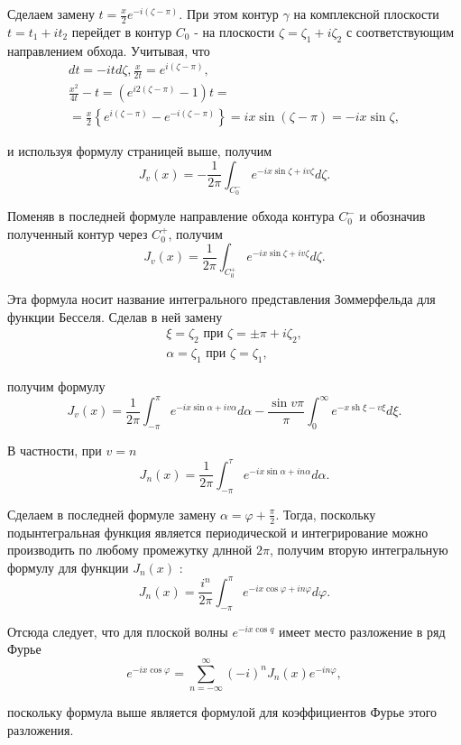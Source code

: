 Сделаем замену $t=\frac{x}{2} e^{-i(\zeta-\pi)}$. При этом контур $\gamma$ на комплексной плоскости $t=t_{1}+i t_{2}$ перейдет в контур $C_{0}$ - на плоскости $\zeta=\zeta_{1}+i \zeta_{2}$ с соответствующим направлением обхода. Учитывая, что
\[
\begin{aligned}
	d t=-i t d \zeta, \frac{x}{2 t}=e^{i(\zeta-\pi)}, \\
	\frac{x^{2}}{4 t}-t=\left(e^{i 2(\zeta-\pi)}-1\right) t= \\
	=\frac{x}{2}\left\{e^{i(\zeta-\pi)}-e^{-i(\zeta-\pi)}\right\}=i x \sin (\zeta-\pi)=-i x \sin \zeta,
\end{aligned}
\]

и используя формулу страницей выше, получим
\[
J_{v}(x)=-\frac{1}{2 \pi} \int_{C_{0}^{-}} e^{-i x \sin \zeta+i v\zeta} d \zeta.
\]

Поменяв в последней формуле направление обхода контура $C_{0}^{-}$ и обозначив полученный контур через $C_{0}^{+}$, получим
\[
J_{v}(x)=\frac{1}{2 \pi} \int_{C_{0}^{+}} e^{-i x \sin \zeta +i v\zeta} d \zeta .
\]

Эта формула носит название интегрального представления Зоммерфельда для функции Бесселя. Сделав в ней замену
\[
\begin{array}{l}
	\xi=\zeta_{2} \text { при } \zeta= \pm \pi+i\zeta_2, \\
	\alpha=\zeta_{1} \text { при } \zeta=\zeta_{1},
\end{array}
\]

получим формулу
\[
J_{v}(x)=\frac{1}{2 \pi} \int_{-\pi}^{\pi} e^{-i x \sin \alpha+i v \alpha} d \alpha-\frac{\sin v \pi}{\pi} \int_{0}^{\infty} e^{-x \operatorname{sh} \xi-v \xi} d \xi .
\]

В частности, при $v=n$
\[
J_{n}(x)=\frac{1}{2 \pi} \int_{-\pi}^{\tau} e^{-i x \sin \alpha+i n \alpha} d \alpha .
\]


Сделаем в последней формуле замену $\alpha=\varphi+\frac{\pi}{2}$. Тогда, поскольку подынтегральная функция является периодической и интегрирование можно производить по любому промежутку длнной $2 \pi$, получим вторую интегральную формулу для функции $J_{n}(x)$ :
\[
J_{n}(x)=\frac{i^{n}}{2 \pi} \int_{-\pi}^{\pi} e^{-i x \cos \varphi+i n \varphi} d \varphi .
\]

Отсюда следует, что для плоской волны $e^{-i x \cos q}$ имеет место разложение в ряд Фурье
\[
e^{-i x \cos \varphi}=\sum_{n=-\infty}^{\infty}(-i)^{n} J_{n}(x) e^{-i n \varphi},
\]

поскольку формула выше является формулой для коэффициентов Фурье этого разложения.
